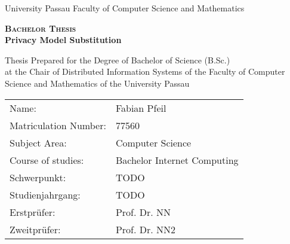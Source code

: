 \begin{titlepage}
	University Passau\newline
	Faculty of Computer Science and Mathematics
	\vspace{2.5cm}
    \begin{center}
    \LARGE\textbf{\textsc{Bachelor Thesis}}\\
    \vspace{1cm}
    \huge \textbf{\textsf{Privacy Model Substitution}} \\
    \vspace{1cm}
    \normalsize

    \vspace{2.5cm}
    \end{center}

 \normalsize{
 	Thesis Prepared for the Degree of\newline
 	Bachelor of Science (B.Sc.)\newline
 	\ \\
 	at the Chair of Distributed Information Systems \newline
 	of the Faculty of Computer Science and Mathematics\newline
 	of the University Passau\newline

    \begin{tabular}{ll}
    	Name: & Fabian Pfeil \\
    	Matriculation Number: & 77560 \\
    	Subject Area: & Computer Science\\
    	Course of studies: & Bachelor Internet Computing\\
    	Schwerpunkt: & TODO \\
    	Studienjahrgang: & TODO \\
	Erstprüfer: & Prof. Dr. NN \\
	Zweitprüfer: & Prof. Dr. NN2 \\ 
    \end{tabular}\\
    }


\end{titlepage}
